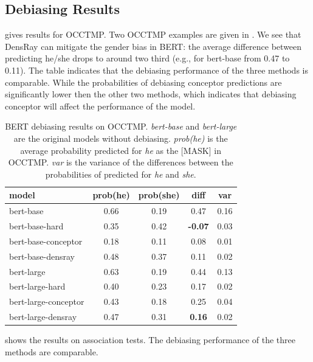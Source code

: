 
\subsection{Debiasing Results}
 gives results for OCCTMP. Two OCCTMP
examples are given in . We see that
DensRay can mitigate the gender bias in BERT: the average
difference between predicting he/she drops to around two
third (e.g., for bert-base from 0.47 to 0.11). The table indicates that the debiasing performance of the three methods is comparable. While the probabilities of debiasing conceptor predictions are significantly lower then the other two methods, which indicates that debiasing conceptor will affect the performance of the model.

\begin{table}[ht]
\centering
\footnotesize
\begin{tabular}{lcccc}
\hline
model & prob(he) & prob(she) & diff & var\\
\hline
bert-base & 0.66 & 0.19 & 0.47 &0.16\\
bert-base-hard & 0.35 & 0.42 & \textbf{-0.07}  &0.03\\
bert-base-conceptor & 0.18 & 0.11 & 0.08 & 0.01\\
bert-base-densray & 0.48 & 0.37 & {0.11} &0.02\\
\hline
bert-large  & 0.63 & 0.19 & 0.44  &0.13\\
bert-large-hard & 0.40 & 0.23 & 0.17  &0.02\\
bert-large-conceptor & 0.43 & 0.18 & 0.25 & 0.04\\
bert-large-densray  & 0.47 & 0.31 & \textbf{0.16} &0.02 \\
\hline
\end{tabular}
\caption{ BERT debiasing results on
  OCCTMP. \textit{bert-base} and \textit{bert-large} are the
  original models without debiasing. \textit{prob(he)} is
  the average probability  predicted for \textit{he} as
  the [MASK] in OCCTMP. \textit{var} is the variance of the
  differences between the probabilities of  predicted
  for \textit{he} and \textit{she}.}
\end{table}

 shows the results on association tests. The debiasing performance of the three methods are comparable.

